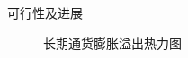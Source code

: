 \documentclass{beamer}
\begin{document}
\begin{frame}{可行性及进展}
\begin{figure}
\begin{minipage}{0.48\textwidth}
      \caption{长期通货膨胀溢出热力图}
    \end{minipage}
  \end{figure}
  

\end{frame}




  
\end{document}
